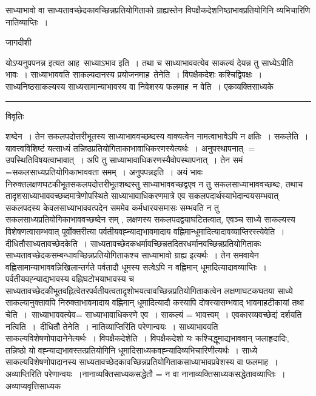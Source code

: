 \documentclass[10pt, openany]{book}
\begin{document}
{{\la साध्याभावो वा साध्यतावच्छेदकावच्छिन्नप्रतियोगिताको ग्राह्यस्तेन विपक्षैकदेशनिष्ठाभावप्रतियोगिनि व्यभिचारिणि नातिव्याप्तिः~।}
\begin{center} जागदीशी \end{center}
{\la योऽप्यनुपपनन्न इत्यत आह\textendash\ साध्याऽभाव इति~। तथा च साध्याभाववत्येव साकल्यं देयन्न तु साध्येऽपीति भावः~। साध्याभाववति साकल्यदानस्य प्रयोजनमाह\textendash\ {\la तेनेति~।} विपक्षैकदेशः कश्चिद्विपक्षः~। साध्यनिष्ठसाकल्यस्य साध्यसामान्याभावस्य वा निवेशस्य फलमाह\textendash\ न वेति~। एकव्यक्तिसाध्यके}\\
\hrule
\begin{center}     विवृतिः \end{center}
शब्देन~। तेन सकलपदोत्तरीभूतस्य साध्याभाववच्छब्दस्य वाक्यत्वेन नामत्वाभावेऽपि न क्षतिः~। सकलेति~। यावत्त्वविशिष्टं यत्साध्यं तन्निष्ठप्रतियोगिताकाभावाधिकरणस्येत्यर्थः~। अनुपस्थापनात् $=$ उपस्थितिविषयत्वाभावात्~। अपि तु साध्याभावाधिकरणस्यैवोपस्थापनात्~। तेन समं =सकलसाध्यप्रतियोगिकाभाववता समम्~। अनुपपन्नइति~। अयं भावः {\qt निरुक्तलक्षणघटकीभूतसकलपदोत्तरीभूतशब्दस्तु }साध्याभाववच्छद्वएव न तु सकलसाध्याभाववच्छब्दः, तथाच तादृृशसाध्याभाववच्छब्दमात्रेणोपस्थिते साध्याभावाधिकरणमात्रे एव सकलपदार्थस्याभेदान्वयसम्भवात् सकलपदस्य केवलसाध्याभाववत्पदेन सममेव कर्मधारयसमासः सम्भवति न तु सकलसाध्यप्रतियोगिकाभाववच्छब्देन सम् , लक्षणस्य सकलपदद्वयाघटितत्वात्, एवञ्च साध्ये साकल्यस्य विशेषणत्वासम्भवात्
पूर्वोक्तरीत्या पर्वतीयवह्न्याद्यभावमादाय वह्निमान्धूमादित्यादावव्याप्तिरस्त्येवेति~। दीधितौसाध्यतावच्छेदकेति~। साध्यतावच्छेदकधर्मावच्छिन्नतदितरधर्मानवच्छिन्नप्रतियोगिताकः साध्यतावच्छेदकसम्बन्धावच्छिन्नप्रतियोगिताकश्च साध्याभावो ग्राह्य इत्यर्थः~। तेन समवायेन वह्निसामान्याभाववन्निखिलान्तर्गते पर्वतादौ धूमस्य सत्वेऽपि न वह्निमान् धूमादित्यादावव्याप्तिः~। पर्वतीयवह्न्याद्यभावस्य वह्निघटोभयाभावस्य च साध्यतावच्छेदकीभूतवह्नित्वेतरपर्वतीयत्वतादृशोभयत्वावच्छिन्नप्रतियोगिताकत्वेन लक्षणाघटकघतया साध्ये साकल्यानुक्तावपि निरुक्ताभावमादाय वह्निमान् धूमादित्यादौ कस्यापि दोषस्यासम्भवाद् भावमाहटीकायां {\la तथा चेति~।}~साध्याभाववत्येव= साध्याभावाधिकरणे एव~। साकल्यं  =  भावत्त्वम्~। एवकारव्यवच्छेद्यं दर्शयति {\la नत्विति~।}~दीधितौ {\la तेनेति~।} नातिव्याप्तिरिति परेणान्वयः~। साध्याभाववति साकल्यविशेषणोपादानेनेत्यर्थः~। विपक्षैकदेशेति~। विपक्षैकदेशो यः कश्चिद्धूमाद्यभाववान् जलाहृदादिः, तन्निष्ठो यो वह्न्याद्यभावस्तत्प्रतियोगिनि धूमादिसाध्यकवह्न्यादिव्यभिचारिणीत्यर्थः~। साध्ये साकल्यविशेषणोपादानस्य साध्यतावच्छेदकावच्छिन्नप्रतियोगिताकसाध्याभावप्रवेशस्य वा फलमाह~। अव्याप्तिरिति परेणान्वयः~।नानाव्यक्तिसाध्यकसद्धेतौ =
\newpage
{\la न वा नानाव्यक्तिसाध्यकसद्धेतावव्याप्तिः~। अव्याप्यवृत्तिसाध्यक}
}
\end{document}
